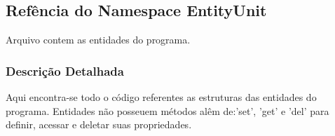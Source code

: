 \hypertarget{namespaceEntityUnit}{\subsection{Refência do Namespace Entity\-Unit}
\label{namespaceEntityUnit}
}


Arquivo contem as entidades do programa.  




\subsubsection{Descrição Detalhada}
Aqui encontra-\/se todo o código referentes as estruturas das entidades do programa. Entidades não posseuem métodos alêm de\-:'set', 'get' e 'del' para definir, acessar e deletar suas propriedades. 